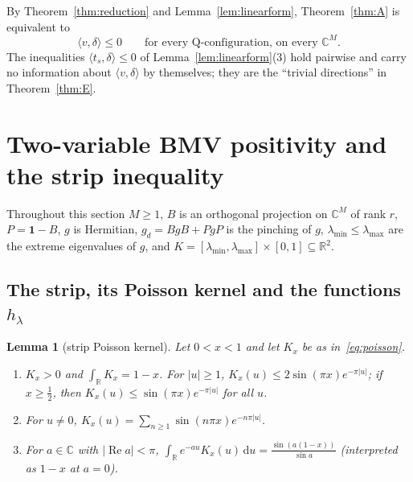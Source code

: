 \documentclass[11pt]{amsart}
\newtheorem{lemma}[theorem]{Lemma}
\theoremstyle{definition}
\theoremstyle{remark}
\numberwithin{equation}{section}
\newcommand{\R}{\mathbb{R}}
\newcommand{\C}{\mathbb{C}}
\renewcommand{\Re}{\operatorname{Re}}
\newcommand{\one}{\mathbf{1}}
\newcommand{\ip}[2]{\langle #1,#2\rangle}
\newcommand{\lmin}{\lambda_{\min}}
\newcommand{\lmax}{\lambda_{\max}}
\newcommand{\dd}{\,\mathrm{d}}
\begin{document}
By Theorem~\ref{thm:reduction} and Lemma~\ref{lem:linearform}, Theorem~\ref{thm:A} is equivalent to
\begin{equation}\label{eq:target}
\ip v\delta\le0\qquad\text{for every Q-configuration, on every }\C^M .
\end{equation}
The inequalities $\ip{t_s}\delta\le0$ of Lemma~\ref{lem:linearform}(3) hold pairwise and carry no information
about $\ip v\delta$ by themselves; they are the ``trivial directions'' in Theorem~\ref{thm:E}.

\section{Two-variable BMV positivity and the strip inequality}\label{sec:strip}

Throughout this section $M\ge1$, $B$ is an orthogonal projection on $\C^M$ of rank $r$, $P=\one-B$, $g$ is Hermitian,
$g_d=BgB+PgP$ is the pinching of $g$, $\lmin\le\lmax$ are the extreme eigenvalues of $g$, and
$K=[\lmin,\lmax]\times[0,1]\subseteq\R^2$.

\subsection{The strip, its Poisson kernel and the functions \texorpdfstring{$h_\lambda$}{h}}

\begin{lemma}[strip Poisson kernel]\label{lem:poisson}
Let $0<x<1$ and let $K_x$ be as in~\eqref{eq:poisson}.
\begin{enumerate}
\item $K_x>0$ and $\int_\R K_x=1-x$. For $|u|\ge1$, $K_x(u)\le2\sin(\pi x)e^{-\pi|u|}$; if $x\ge\frac12$, then
$K_x(u)\le\sin(\pi x)e^{-\pi|u|}$ for all $u$.
\item For $u\ne0$, $K_x(u)=\sum_{n\ge1}\sin(n\pi x)e^{-n\pi|u|}$.
\item For $a\in\C$ with $|\Re a|<\pi$,
$\displaystyle\int_\R e^{-au}K_x(u)\dd u=\frac{\sin(a(1-x))}{\sin a}$ (interpreted as $1-x$ at $a=0$).
\end{enumerate}
\end{lemma}
\end{document}
